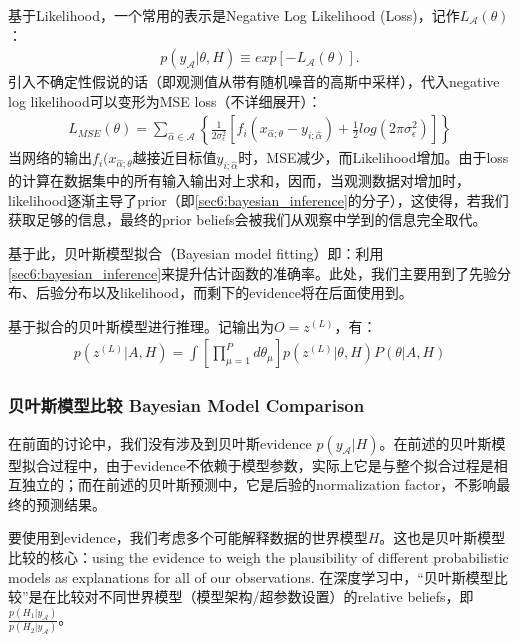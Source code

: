 基于Likelihood，一个常用的表示是Negative Log Likelihood (Loss)，记作$L_{\mathcal{A}}(\theta)$：
\begin{equation}
    \begin{split}
        p(y_{\mathcal{A}}|\theta, H) \equiv exp\left[-L_{\mathcal{A}}(\theta)\right].
    \end{split}
\end{equation}
引入不确定性假说的话（即观测值从带有随机噪音的高斯中采样），代入negative log likelihood可以变形为MSE loss（不详细展开）：
\begin{equation}
    \begin{split}
        L_{MSE}(\theta) = \sum_{\hat{\alpha}\in\mathcal{A}}\left\{
            \frac{1}{2\sigma_{\epsilon}^{2}}[f_{i}(x_{\hat{\alpha};\theta}-y_{i;\hat{\alpha}})+\frac{1}{2}log\left(2\pi\sigma_{\epsilon}^{2}\right)]
        \right\}
    \end{split}
\end{equation}
当网络的输出$f_{i}(x_{\hat{\alpha};\theta}$越接近目标值$y_{i;\hat{\alpha}}$时，MSE减少，而Likelihood增加。由于loss的计算在数据集中的所有输入输出对上求和，因而，当观测数据对增加时，likelihood逐渐主导了prior（即\eqref{sec6:bayesian_inference}的分子），这使得，若我们获取足够的信息，最终的prior beliefs会被我们从观察中学到的信息完全取代。

基于此，贝叶斯模型拟合（Bayesian model fitting）即：利用\eqref{sec6:bayesian_inference}来提升估计函数的准确率。此处，我们主要用到了先验分布、后验分布以及likelihood，而剩下的evidence将在后面使用到。

基于拟合的贝叶斯模型进行推理。记输出为$O=z^{(L)}$，有：
\begin{equation}
    \begin{split}
        p(z^{(L)}|A,H) = \int \left[\prod_{\mu=1}^{P}d\theta_\mu\right]
        p(z^{(L)}|\theta,H)P(\theta|A,H)
    \end{split}
\end{equation}

\subsubsection{贝叶斯模型比较 Bayesian Model Comparison}
在前面的讨论中，我们没有涉及到贝叶斯evidence $p(y_\mathcal{A}|H)$。在前述的贝叶斯模型拟合过程中，由于evidence不依赖于模型参数，实际上它是与整个拟合过程是相互独立的；而在前述的贝叶斯预测中，它是后验的normalization factor，不影响最终的预测结果。

要使用到evidence，我们考虑多个可能解释数据的世界模型$H$。这也是贝叶斯模型比较的核心：using the evidence to weigh the plausibility of diﬀerent probabilistic models as explanations for all of our observations. 在深度学习中，``贝叶斯模型比较''是在比较对不同世界模型（模型架构/超参数设置）的relative beliefs，即$\frac{p(H_1|y_{\mathcal{A}})}{p(H_2|y_{\mathcal{A}})}$。

